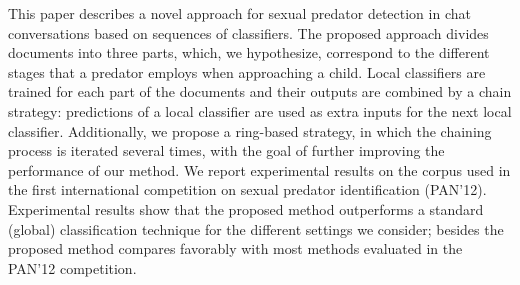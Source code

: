 This paper describes a novel approach for sexual predator detection in chat conversations based on sequences of classifiers. The proposed approach divides
 documents into three parts, which, we hypothesize, correspond to the different
 stages that a predator employs when approaching a child. Local classifiers are
 trained for each part of the documents and their outputs are combined by a
 chain  strategy: predictions of a local classifier are used as extra inputs for
 the next local classifier. Additionally, we propose a ring-based strategy, in
 which the chaining process is iterated several times, with the goal of further
 improving the performance of our method.  We report experimental results on the
 corpus used in the first international competition on sexual predator
 identification (PAN'12). Experimental results show that the proposed method
 outperforms a standard (global) classification technique for the different
 settings we consider; besides the proposed method compares favorably with most
 methods evaluated in the PAN'12 competition.

